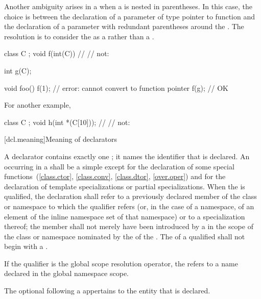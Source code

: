 \pnum
Another ambiguity arises in a
 when a
is nested in parentheses.
In this case, the choice is between the declaration of a parameter of type
pointer to function and the declaration of a parameter with redundant
parentheses around the
.
The resolution is to consider the
as a
rather than a
.
\begin{example}
\begin{codeblock}
class C { };
void f(int(C)) { }              // 
                                // not: 

int g(C);

void foo() {
  f(1);                         // error: cannot convert  to function pointer
  f(g);                         // OK
}
\end{codeblock}

For another example,
\begin{codeblock}
class C { };
void h(int *(C[10]));           // 
                                // not: 
\end{codeblock}
\end{example}

[dcl.meaning]{Meaning of declarators}%

\pnum
{}%
A declarator contains exactly one
;
it names the identifier that is declared.
An
occurring in
a
shall be a simple
except for the declaration of some special functions~(\ref{class.ctor},
\ref{class.conv}, \ref{class.dtor}, \ref{over.oper}) and
for the declaration of template specializations
or partial specializations.
When the
is qualified, the declaration shall refer to a previously declared member
of the class or namespace to which the qualifier refers (or,
in the case of a namespace,
of an element of the inline namespace
set of that namespace) or to a specialization thereof; the member
shall not merely have been introduced by a
in the scope of the class or namespace nominated by the
of the
.
The  of a qualified  shall not
begin with a .
\begin{note}
If the qualifier is the global
\tcode{::}
scope resolution operator, the
refers to a name declared in the global namespace scope.
\end{note}
The optional  following a  appertains to the entity that is declared.

